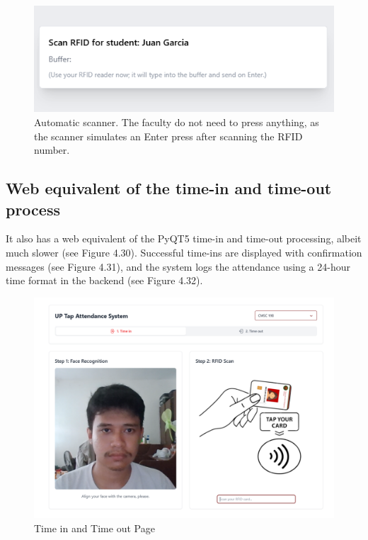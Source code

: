 \begin{figure}[h] %
	\centering
	\includegraphics[width=1\textwidth]{figures/chapter4/batch_rfid_scan.png} %
	\caption{Automatic scanner. The faculty do not need to press anything, as the scanner simulates an Enter press after scanning the RFID number.}
	\label{fig:batch_rfid_scan}
\end{figure}
\clearpage
\subsection{Web equivalent of the time-in and time-out process}
It also has a web equivalent of the PyQT5 time-in and time-out processing, albeit much slower (see Figure 4.30). Successful time-ins are displayed with confirmation messages (see Figure 4.31), and the system logs the attendance using a 24-hour time format in the backend (see Figure 4.32).
\begin{figure}[h] %
	\centering
	\includegraphics[width=1.0\textwidth]{figures/chapter4/frontend.png} %
	\caption{Time in and Time out Page}
	\label{fig:frontend}
\end{figure}

